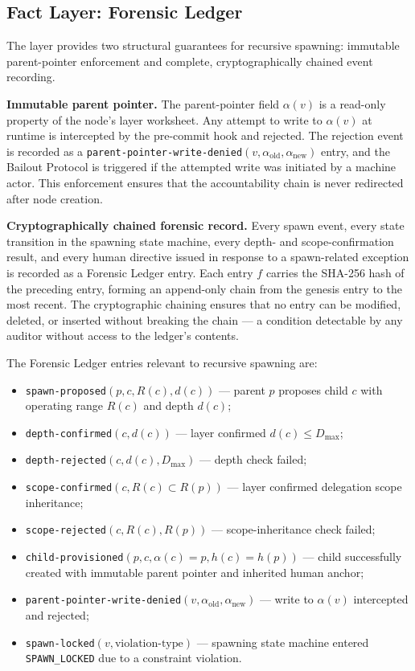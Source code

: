 \subsection{Fact Layer: Forensic Ledger}
\label{sec:rs-fact-fledger}

The \fact{} layer provides two structural guarantees for recursive spawning:
immutable parent-pointer enforcement and complete, cryptographically chained event
recording.

\medskip
\noindent\textbf{Immutable parent pointer.}  The parent-pointer field
$\alpha(v)$ is a read-only property of the node's \fact{} layer worksheet.  Any
attempt to write to $\alpha(v)$ at runtime is intercepted by the pre-commit hook
and rejected.  The rejection event is recorded as a
\texttt{parent-pointer-write-denied}$(v, \alpha_{\text{old}}, \alpha_{\text{new}})$
entry, and the Bailout Protocol is triggered if the attempted write was
initiated by a machine actor.  This enforcement ensures that the accountability
chain is never redirected after node creation.

\medskip
\noindent\textbf{Cryptographically chained forensic record.}  Every spawn event,
every state transition in the spawning state machine, every depth- and
scope-confirmation result, and every human directive issued in response to a
spawn-related exception is recorded as a Forensic Ledger entry.  Each entry $f$
carries the SHA-256 hash of the preceding entry, forming an append-only chain
from the genesis entry to the most recent.  The cryptographic chaining ensures
that no entry can be modified, deleted, or inserted without breaking the chain —
a condition detectable by any auditor without access to the ledger's contents.

The Forensic Ledger entries relevant to recursive spawning are:

\begin{itemize}\itemsep=0pt
\item \texttt{spawn-proposed}$(p, c, R(c), d(c))$ — parent $p$ proposes child
$c$ with operating range $R(c)$ and depth $d(c)$;
\item \texttt{depth-confirmed}$(c, d(c))$ — \bounds{} layer confirmed $d(c) \leq D_{\max}$;
\item \texttt{depth-rejected}$(c, d(c), D_{\max})$ — depth check failed;
\item \texttt{scope-confirmed}$(c, R(c) \subset R(p))$ — \bounds{} layer confirmed
delegation scope inheritance;
\item \texttt{scope-rejected}$(c, R(c), R(p))$ — scope-inheritance check failed;
\item \texttt{child-provisioned}$(p, c, \alpha(c) = p, h(c) = h(p))$ — child
successfully created with immutable parent pointer and inherited human anchor;
\item \texttt{parent-pointer-write-denied}$(v, \alpha_{\text{old}}, \alpha_{\text{new}})$
— write to $\alpha(v)$ intercepted and rejected;
\item \texttt{spawn-locked}$(v, \text{violation-type})$ — spawning state machine
entered \texttt{SPAWN\_LOCKED} due to a constraint violation.
\end{itemize}

